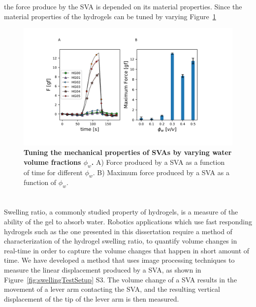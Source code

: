 the force produce by the SVA is depended on its material properties. Since the material properties of the hydrogels can be tuned by varying Figure~\ref{fig:svaForce}
\begin{figure}[!htb]
\centering
\includegraphics[width=.8\textwidth]{svaForce.pdf}
    \caption[]{\textbf{Tuning the mechanical properties of SVAs by varying water volume fractions $\phi_{w}$.} A) Force produced by a SVA as a function of time for different $\phi_{w}$. B) Maximum force produced by a SVA as a function of $\phi_{w}$. }
    \label{fig:svaForce}
\end{figure}

\section{}
Swelling ratio, a commonly studied property of hydrogels, is a measure of the ability of the gel to absorb water. Robotics applications which use fast responding hydrogels such as the one presented in this dissertation require a method of characterization of the hydrogel swelling ratio, to quantify volume changes in real-time in order to capture the volume changes that happen in short amount of time. We have developed a method that uses image processing techniques to measure the linear displacement produced by a SVA, as shown in Figure~\ref{fig:swellingTestSetup} S3. The volume change of a SVA results in the movement of a lever arm contacting the SVA, and the resulting vertical displacement of the tip of the lever arm is then measured. 

